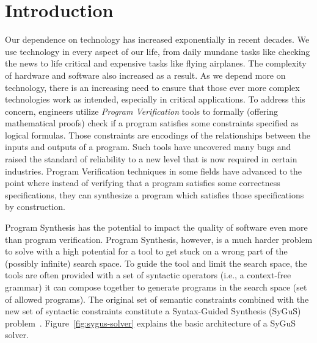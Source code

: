 \section{Introduction}
\label{sec:introduction}
Our dependence on technology has increased exponentially in recent decades.
%
We use technology in every aspect of our life, from daily mundane tasks like checking the news to life critical and expensive tasks like flying airplanes.
%
The complexity of hardware and software also increased as a result.
%
As we depend more on technology, there is an increasing need to ensure that those ever more complex technologies work as intended, especially in critical applications.
%
To address this concern, engineers utilize \emph{Program Verification} tools
%
to formally (offering mathematical proofs) check if a program satisfies some constraints specified as logical formulas.
%
Those constraints are encodings of the relationships between the inputs and outputs of a program.
%
Such tools have uncovered many bugs and raised the standard of reliability to a new level that is now required in certain industries.
%
Program Verification techniques in some fields have advanced to the point where instead of verifying that a program satisfies some correctness specifications,
%
they can synthesize a program which satisfies those specifications by construction.

Program Synthesis has the potential to impact the quality of software even more than program verification.
Program Synthesis, however, is a much harder problem to solve with a high potential for a tool to get stuck on a wrong part of the (possibly infinite) search space.
%
To guide the tool and limit the search space, the tools are often provided with a set of syntactic operators (i.e., a context-free grammar) it can compose together to generate programs in the search space (set of allowed programs).
%
The original set of semantic constraints combined with the new set of syntactic constraints constitute a Syntax-Guided Synthesis (SyGuS) problem~\cite{sygus:2013}. Figure~\ref{fig:sygus-solver} explains the basic architecture of a SyGuS solver.


